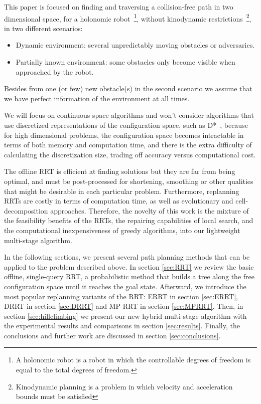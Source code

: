 \documentclass[10pt, conference, compsoc]{IEEEtran}
\begin{document}
This paper is focused on finding and traversing a collision-free path in
two dimensional space, for a
holonomic robot~\footnote{A holonomic robot is a robot in
which the controllable degrees of freedom is equal to the total degrees of
freedom.},
without kinodynamic restrictions~\footnote{Kinodynamic planning is a problem in which velocity and acceleration
bounds must be satisfied}, in two different scenarios:
\begin{itemize}
\item Dynamic environment: several unpredictably moving obstacles or adversaries. 
\item Partially known environment: some obstacles only become visible when
approached by the robot.
\end{itemize}
Besides from one (or few) new obstacle(s) in the second scenario we assume 
that we have perfect information of the environment at all times.

We will focus on continuous space algorithms and
won't consider
algorithms that use discretized representations of the configuration space, such
as D*~\cite{Stentz95},
because for high dimensional problems, the
configuration space becomes intractable in terms of both memory and computation
time, and there is the extra difficulty of calculating the discretization size,
trading off accuracy versus computational cost.

The offline RRT is efficient at finding solutions but they are far from
being optimal, and must be post-processed for shortening, smoothing or other qualities
that might be desirable in each particular problem. Furthermore, replanning RRTs
are costly in terms of computation time, as well as evolutionary and cell-decomposition 
approaches. Therefore, the novelty of this work is
the mixture of the feasibility benefits of the RRTs, the repairing capabilities
of local search, and the computational inexpensiveness of greedy algorithms,
into our lightweight multi-stage algorithm.

In the following sections, we present several path planning methods that can be
applied to the problem described above. In section \ref{sec:RRT} we review
the basic offline, single-query RRT, a probabilistic method that builds a
tree along the free configuration space until it reaches the goal state. 
Afterward, we introduce the most popular replanning variants of the
RRT: ERRT in section \ref{sec:ERRT}, DRRT in section \ref{sec:DRRT} and MP-RRT in section \ref{sec:MPRRT}.
Then, in section \ref{sec:hillclimbing} we present our new hybrid multi-stage algorithm with the
experimental results and comparisons in section \ref{sec:results}. Finally, the 
conclusions and further work are discussed in section \ref{sec:conclusions}.
\end{document}
